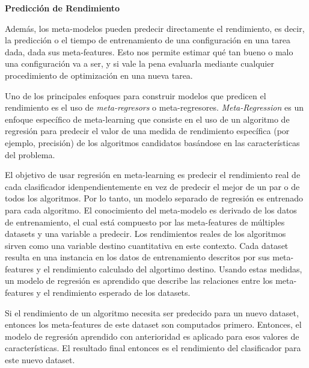 \textbf{Predicción de Rendimiento}


\quad

Además, los meta-modelos pueden predecir directamente el rendimiento, es decir, la predicción o el tiempo de entrenamiento de una configuración en una tarea dada, dada sus meta-features. Esto nos permite estimar qué tan bueno o malo una configuración va a ser, y si vale la pena evaluarla mediante cualquier procedimiento de optimización en una nueva tarea.

Uno de los principales enfoques para construir modelos que predicen el rendimiento es el uso de \textit{meta-regresors} o meta-regresores. \textit{Meta-Regression} es un enfoque específico de meta-learning que consiste en el uso de un algoritmo de regresión para predecir el valor de una medida de rendimiento específica (por ejemplo, precisión) de los algoritmos candidatos basándose en las características del problema. 

El objetivo de usar regresión en meta-learning es predecir el rendimiento real de cada clasificador idenpendientemente en vez de predecir el mejor de un par o de todos los algoritmos. Por lo tanto, un modelo separado de regresión es entrenado para cada algoritmo. El conocimiento del meta-modelo es derivado de los datos de entrenamiento, el cual está compuesto por las meta-features de múltiples datasets y una variable a predecir. Los rendimientos reales de los algoritmos sirven como una variable destino cuantitativa en este contexto. Cada dataset resulta en una instancia en los datos de entrenamiento descritos por sus meta-features y el rendimiento calculado del algortimo destino. Usando estas medidas, un modelo de regresión es aprendido que describe las relaciones entre los meta-features y el rendimiento esperado de los datasets.

Si el rendimiento de un algoritmo necesita ser predecido para un nuevo dataset, entonces los meta-features de este dataset son computados primero. Entonces, el modelo de regresión aprendido con anterioridad es aplicado para esos valores de características. El resultado final entonces es el rendimiento del clasificador para este nuevo dataset.

